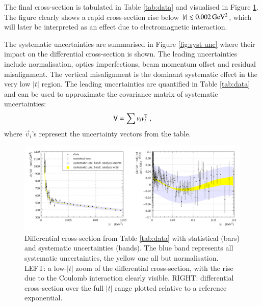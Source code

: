 The final cross-section is tabulated in Table \ref{tab:data} and visualised in Figure \ref{fig:dsdt}. The figure clearly shows a rapid cross-section rise below $|t| \lesssim 0.002\,{\rm GeV^2}$, which will later be interpreted as an effect due to electromagnetic interaction.

The systematic uncertainties are summarised in Figure \ref{fig:syst unc} where their impact on the differential cross-section is shown. The leading uncertainties include normalisation, optics imperfections, beam momentum offset and residual misalignment. The vertical misalignment is the dominant systematic effect in the very low $|t|$ region. The leading uncertainties are quantified in Table \ref{tab:data} and can be used to approximate the covariance matrix of systematic uncertainties:
\begin{equation}
\label{eq:covar mat}
\mathsf{V} = \sum v_i v_i^{\rm T}\ ,
\end{equation}
where $\vec v_i$'s represent the uncertainty vectors from the table.







\begin{figure}
\vskip-5mm
\begin{center}
\includegraphics[width=18cm]{fig/t_dist_tabulation.pdf}
\vskip-3mm
\caption{%
Differential cross-section from Table \ref{tab:data} with statistical (bars) and systematic uncertainties (bands). The blue band represents all systematic uncertainties, the yellow one all but normalisation. LEFT: a low-$|t|$ zoom of the differential cross-section, with the rise due to the Coulomb interaction clearly visible. RIGHT: differential cross-section over the full $|t|$ range plotted relative to a reference exponential.
}
\label{fig:dsdt}
\end{center}
\end{figure}


